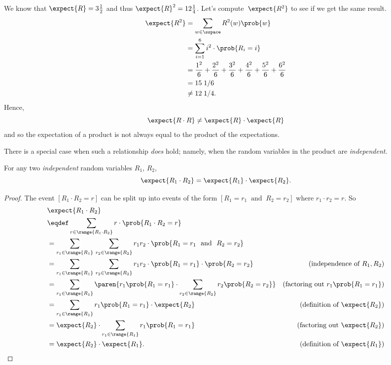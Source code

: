 We know that $\expect{R} = 3\frac{1}{2}$ and thus $\expect{R}^2 =
12\frac{1}{4}$.  Let's compute~$\expect{R^2}$ to see if we get the same
result.
\begin{align*}
\expect{R^2}
    & = \sum_{w \in \sspace} R^2(w) \prob{w} \\
    & = \sum_{i=1}^6 i^2 \cdot \prob{R_i = i} \\
    & = \frac{1^2}{6} + \frac{2^2}{6} + \frac{3^2}{6} +
            \frac{4^2}{6} + \frac{5^2}{6} + \frac{6^2}{6} \\
    & =   15\; 1/6\\
    & \neq  12 \; 1/4.\\
\end{align*}
Hence,
\begin{equation*}
    \expect{R \cdot R} \ne \expect{R} \cdot \expect{R}
\end{equation*}
and so the expectation of a product is not always equal to the product
of the expectations.

There is a special case when such a relationship \emph{does} hold;
namely, when the random variables in the product are
\emph{independent}.

\begin{theorem}\label{th:prod}
For any two \emph{independent} random variables $R_1$, $R_2$,
\[
\expect{R_1 \cdot R_2} = \expect{R_1} \cdot \expect{R_2}.
\]
\end{theorem}

\begin{proof}
The event $[R_1 \cdot R_2=r]$ can be split up into events of the form
$[R_1 = r_1\ \text{ and }\ R_2 = r_2]$ where $r_1\cdot r_2=r$.  So
\begin{align*}
\lefteqn{\expect{R_1 \cdot R_2}}\\
& \eqdef \sum_{r \in \range{R_1\cdot R_2}} r\cdot \prob{R_1\cdot R_2=r}\\
& =      \sum_{r_1 \in \range{R_1}} \, \sum_{r_2 \in \range{R_2}}
            r_1 r_2 \cdot \prob{R_1=r_1\ \text{ and }\ R_2=r_2} \\
& =      \sum_{r_1 \in \range{R_1}} \, \sum_{r_2 \in \range{R_2}}
            r_1 r_2 \cdot \prob{R_1=r_1}\cdot \prob{R_2=r_2}
                    &\text{(independence of $R_1,R_2$)}\\
& =      \sum_{r_1 \in \range{R_1}} \paren{r_1\prob{R_1=r_1} \cdot
              \sum_{r_2 \in \range{R_2}} r_2 \prob{R_2=r_2}}
                    &\text{(factoring out $r_1\prob{R_1=r_1}$)}\\
& =      \sum_{r_1 \in \range{R_1}} r_1\prob{R_1=r_1} \cdot \expect{R_2}
                    &\text{(definition of $\expect{R_2}$)}\\
& =       \expect{R_2} \cdot \sum_{r_1 \in \range{R_1}} r_1\prob{R_1=r_1}
                    &\text{(factoring out $\expect{R_2}$)}\\
& =       \expect{R_2} \cdot  \expect{R_1}.
                    &\text{(definition of $\expect{R_1}$)}
\end{align*}
\end{proof}

